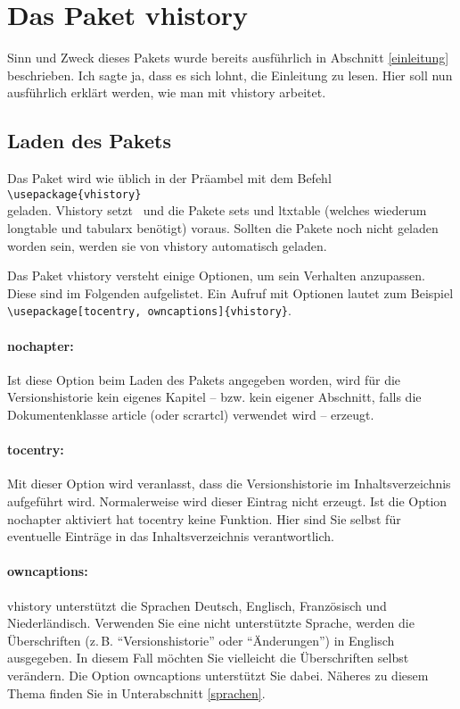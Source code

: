\section{Das Paket vhistory}
Sinn und Zweck dieses Pakets wurde bereits ausführlich in Abschnitt \ref{einleitung} beschrieben. Ich sagte ja, dass es sich lohnt, die Einleitung zu lesen. Hier soll nun ausführlich erklärt werden, wie man mit vhistory arbeitet.

\subsection{Laden des Pakets}\label{laden}
Das Paket wird wie üblich in der Präambel mit dem Befehl\\
\mbox{}\hspace{2em}\verb|\usepackage{vhistory}|\\
geladen. Vhistory setzt \LaTeXe\ und die Pakete sets und ltxtable (welches wiederum longtable und tabularx benötigt) voraus. Sollten die Pakete noch nicht geladen worden sein, werden sie von vhistory automatisch geladen.

Das Paket vhistory versteht einige Optionen, um sein Verhalten anzupassen. Diese sind im Folgenden aufgelistet. Ein Aufruf mit Optionen lautet zum Beispiel\\
\mbox{}\hspace{2em}\verb|\usepackage[tocentry, owncaptions]{vhistory}|.

\paragraph{nochapter:} Ist diese Option beim Laden des Pakets angegeben worden, wird für die Versionshistorie kein eigenes Kapitel -- bzw. kein eigener Abschnitt, falls die Dokumentenklasse article (oder scrartcl) verwendet wird -- erzeugt.

\paragraph{tocentry:} Mit dieser Option wird veranlasst, dass die Versionshistorie im Inhaltsverzeichnis aufgeführt wird. Normalerweise wird dieser Eintrag nicht erzeugt. Ist die Option nochapter aktiviert hat tocentry keine Funktion. Hier sind Sie selbst für eventuelle Einträge in das Inhaltsverzeichnis verantwortlich.

\paragraph{owncaptions:} vhistory unterstützt die Sprachen Deutsch, Englisch, Französisch und Niederländisch. Verwenden Sie eine nicht unterstützte Sprache, werden die Überschriften (z.\,B. "`Versionshistorie"' oder "`Änderungen"') in Englisch ausgegeben. In diesem Fall möchten Sie vielleicht die Überschriften selbst verändern. Die Option own\-capt\-ions unterstützt Sie dabei. Näheres zu diesem Thema finden Sie in Unterabschnitt \ref{sprachen}.

